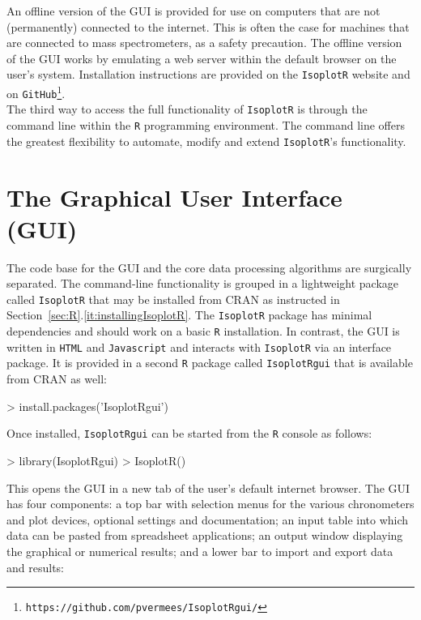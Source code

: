 \begin{refsection}
An offline version of the GUI is provided for use on computers that
are not (permanently) connected to the internet. This is often the
case for machines that are connected to mass spectrometers, as a
safety precaution. The offline version of the GUI works by emulating a
web server within the default browser on the user's
system. Installation instructions are provided on the
\texttt{IsoplotR} website and on
\texttt{GitHub}\footnote{\texttt{https://github.com/pvermees/IsoplotRgui/}}.\\

The third way to access the full functionality of \texttt{IsoplotR} is
through the command line within the \texttt{R} programming
environment. The command line offers the greatest flexibility to
automate, modify and extend \texttt{IsoplotR}'s functionality.

\section{The Graphical User Interface (GUI)}
\label{sec:GUI}

The code base for the GUI and the core data processing algorithms are
surgically separated. The command-line functionality is grouped in a
lightweight package called \texttt{IsoplotR} that may be installed
from CRAN as instructed in
Section~\ref{sec:R}.\ref{it:installingIsoplotR}. The \texttt{IsoplotR}
package has minimal dependencies and should work on a basic \texttt{R}
installation. In contrast, the GUI is written in \texttt{HTML} and
\texttt{Javascript} and interacts with \texttt{IsoplotR} via an
interface package. It is provided in a second \texttt{R} package
called \texttt{IsoplotRgui} that is available from CRAN as well:

\begin{console}
> install.packages('IsoplotRgui')
\end{console}

Once installed, \texttt{IsoplotRgui} can be started from the
\texttt{R} console as follows:

\begin{console}
> library(IsoplotRgui)
> IsoplotR()
\end{console}

This opens the GUI in a new tab of the user's default internet
browser.  The GUI has four components: a top bar with selection menus
for the various chronometers and plot devices, optional settings and
documentation; an input table into which data can be pasted from
spreadsheet applications; an output window displaying the graphical or
numerical results; and a lower bar to import and export data and
results:\\


\end{refsection}
